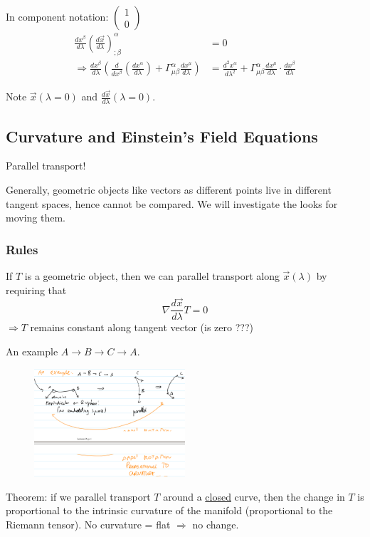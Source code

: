 \documentclass[a4paper]{article} %
\newcommand{\pmx}[1]{
\begin{pmatrix}
#1
\end{pmatrix}
}
\begin{document}
In component notation: $\pmx{1\\0}$
\begin{align}
\frac{dx^{\beta}}{d\lambda}\left(\frac{d\vec{x}}{d\lambda}\right)^{\alpha}_{;\beta}&=0\\
\Rightarrow\frac{dx^{\beta}}{d\lambda}\left(\frac{d}{dx^{\beta}}\left(\frac{dx^{\alpha}}{d\lambda}\right)
+\Gamma^{\alpha}_{\mu\beta}\frac{dx^{\mu}}{d\lambda}\right)
&=\frac{d^2 x^{\alpha}}{d\lambda^2}+\Gamma^{\alpha}_{\mu\beta}\frac{dx^{\mu}}{d\lambda}\cdot\frac{dx^{\beta}}{d\lambda}
\end{align}

Note $\vec{x}(\lambda=0)$ and $\frac{d\vec{x}}{d\lambda}(\lambda=0)$.


\subsection{Curvature and Einstein's Field Equations}
Parallel transport!

Generally, geometric objects like vectors as different points live in different tangent spaces, hence cannot be compared. We will investigate the looks for moving them.

\subsubsection{Rules}
If $T$ is a geometric object, then we can parallel transport along $\vec{x}(\lambda)$ by requiring that
\begin{equation}
\nabla\frac{d\vec{x}}{d\lambda}T=0
\end{equation}
$\Rightarrow T$ remains constant along tangent vector (is zero ???)

An example $A \to B \to C \to A$.
\begin{figure}[h]
\centering
\includegraphics[width=0.5\textwidth]{images/parallel_transport_example.png}
\end{figure}

Theorem: if we parallel transport $T$ around a \underline{closed} curve, then the change in $T$ is proportional to the intrinsic curvature of the manifold (proportional to the Riemann tensor). No curvature = flat $\Rightarrow$ no change.
\end{document}
